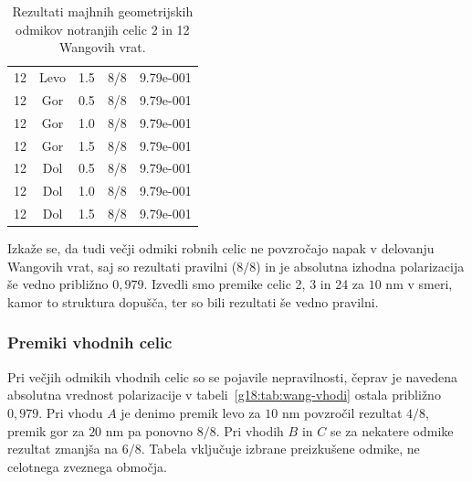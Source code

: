\documentclass[12pt,a4paper]{article}
\begin{document}
\begin{table}[H]
\begin{minipage}{0.49\textwidth}
{\begin{tabular}{|c|c|c|c|c|}
                12 & Levo & 1.5 & 8/8 & 9.79e-001 \\
                12 & Gor & 0.5 & 8/8 & 9.79e-001 \\
                12 & Gor & 1.0 & 8/8 & 9.79e-001 \\
                12 & Gor & 1.5 & 8/8 & 9.79e-001 \\
                12 & Dol & 0.5 & 8/8 & 9.79e-001 \\
                12 & Dol & 1.0 & 8/8 & 9.79e-001 \\
                12 & Dol & 1.5 & 8/8 & 9.79e-001 \\
                \hline
            \end{tabular}
        }
    \end{minipage}

    \caption{Rezultati majhnih geometrijskih odmikov notranjih celic 2 in 12 Wangovih vrat.}
    \label{g18:tab:wang-notranje-2-12}
\end{table}

Izkaže se, da tudi večji odmiki robnih celic ne povzročajo napak v delovanju Wangovih vrat, saj so rezultati pravilni ($8/8$) in je absolutna izhodna polarizacija še vedno približno $0{,}979$.
Izvedli smo premike celic 2, 3 in 24 za $10$ nm v smeri, kamor to struktura dopušča, ter so bili rezultati še vedno pravilni.

\subsubsection{Premiki vhodnih celic}

Pri večjih odmikih vhodnih celic so se pojavile nepravilnosti, čeprav je navedena absolutna vrednost
polarizacije v tabeli~\ref{g18:tab:wang-vhodi} ostala približno $0{,}979$.
Pri vhodu $A$ je denimo premik levo za $10$ nm povzročil rezultat $4/8$, premik gor za $20$ nm
pa ponovno $8/8$. Pri vhodih $B$ in $C$ se za nekatere odmike rezultat zmanjša na $6/8$.
Tabela vključuje izbrane preizkušene odmike, ne celotnega zveznega območja.
\end{document}
